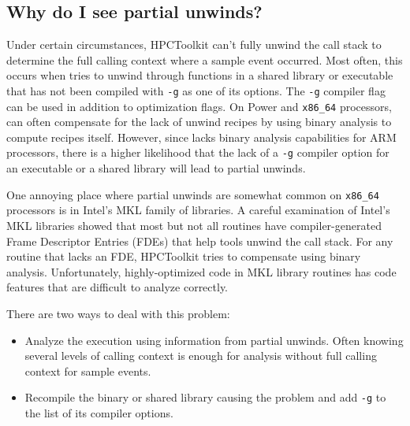 \documentclass[11pt,twoside,letterpaper]{report}
\begin{document}

\subsection{Why do I see partial unwinds?}
\label{sec:partial}

Under certain circumstances, HPCToolkit can't fully unwind the call
stack to determine the full calling context where a sample event
occurred. Most often, this occurs when \hpcrun{} tries to unwind
through functions in a shared library or executable that has not
been compiled with \verb|-g| as one of its options. The \verb|-g|
compiler flag can be used in addition to optimization flags. On
Power and \verb|x86_64| processors, \hpcrun{} can often compensate
for the lack of unwind recipes by using
binary analysis to compute recipes itself. However, since \hpcrun{}
lacks binary analysis capabilities for ARM processors, there is a
higher likelihood that the lack of a \verb|-g| compiler option for
an executable or a shared library will lead to partial unwinds.

One annoying place where partial unwinds are somewhat common on \verb|x86_64| 
processors is in Intel's MKL family of libraries.  A careful examination of Intel’s
MKL libraries showed that most but not all routines have
compiler-generated Frame Descriptor Entries (FDEs) that help tools 
unwind the call stack.  For any routine that lacks
an FDE, HPCToolkit tries to compensate using binary analysis.  
Unfortunately, highly-optimized code in MKL library
routines has code features that are difficult to analyze correctly.

There are two ways to deal with this problem:
\begin{itemize}
\item Analyze the execution using information from partial unwinds. Often knowing several levels of calling context is enough for analysis without full calling context for sample events.
\item 
Recompile the binary or shared library causing the problem and add \verb|-g| to the list of its compiler options.
\end{itemize}

\end{document}
